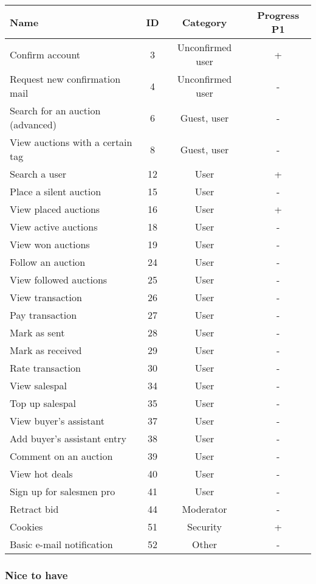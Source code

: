 	\begin{tabular}{l|c c | c}
	  Name & ID & Category & Progress P1\\ 
	  \hline
	  Confirm account & 3 & Unconfirmed user & +\\
	  Request new confirmation mail & 4 & Unconfirmed user & -\\
	  Search for an auction (advanced) & 6 & Guest, user & - \\
	  View auctions with a certain tag & 8 & Guest, user & -\\
	  Search a user & 12 & User & +\\
	  Place a silent auction & 15 & User & -\\
	  View placed auctions & 16 & User & +\\
	  View active auctions & 18 & User & -\\
	  View won auctions & 19 & User & -\\
	  Follow an auction & 24 & User & -\\
	  View followed auctions & 25 & User & -\\
	  View transaction & 26 & User & -\\
	  Pay transaction & 27 & User & -\\
	  Mark as sent & 28 & User & -\\
	  Mark as received & 29 & User & -\\
	  Rate transaction & 30 & User & -\\
	  View salespal & 34 & User & -\\
	  Top up salespal & 35 & User & -\\
	  View buyer's assistant & 37 & User & -\\
	  Add buyer's assistant entry & 38 & User & -\\
	  Comment on an auction & 39 & User & -\\
	  View hot deals & 40 & User & -\\
	  Sign up for salesmen pro & 41 & User & -\\
	  Retract bid & 44 & Moderator & -\\
	  Cookies & 51 & Security & +\\	  
	  Basic e-mail notification & 52 & Other & -	  
	\end{tabular} 
	
	\subsubsection{Nice to have}
	
